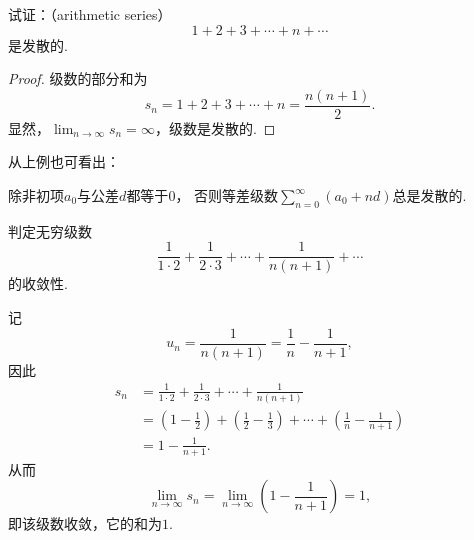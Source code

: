 \begin{example}\label{example:无穷级数.等差级数的收敛性}
试证：（arithmetic series）\begin{equation*}
	1+2+3+\dotsb+n+\dotsb
\end{equation*}是发散的.
\begin{proof}
级数的部分和为\begin{equation*}
	s_n = 1+2+3+\dotsb+n = \frac{n(n+1)}{2}.
\end{equation*}
显然，\(\lim_{n\to\infty} s_n=\infty\)，级数是发散的.
\end{proof}
\end{example}
从上例也可看出：
\begin{proposition}
除非初项\(a_0\)与公差\(d\)都等于\(0\)，
否则等差级数\(\sum_{n=0}^\infty(a_0+nd)\)总是发散的.
\end{proposition}

\begin{example}
判定无穷级数\begin{equation*}
	\frac{1}{1\cdot2}+\frac{1}{2\cdot3}+\dotsb+\frac{1}{n(n+1)}+\dotsb
\end{equation*}的收敛性.
\begin{solution}
记\begin{equation*}
	u_n = \frac{1}{n(n+1)} = \frac{1}{n}-\frac{1}{n+1},
\end{equation*}
因此\begin{align*}
	s_n &= \frac{1}{1\cdot2}+\frac{1}{2\cdot3}+\dotsb+\frac{1}{n(n+1)} \\
	&= \left(1-\frac{1}{2}\right)+\left(\frac{1}{2}-\frac{1}{3}\right)
	+\dotsb+\left(\frac{1}{n}-\frac{1}{n+1}\right) \\
	&= 1-\frac{1}{n+1}.
\end{align*}
从而\begin{equation*}
	\lim_{n\to\infty} s_n
	= \lim_{n\to\infty} \left(1-\frac{1}{n+1}\right)
	= 1,
\end{equation*}
即该级数收敛，它的和为\(1\).
\end{solution}
\end{example}

